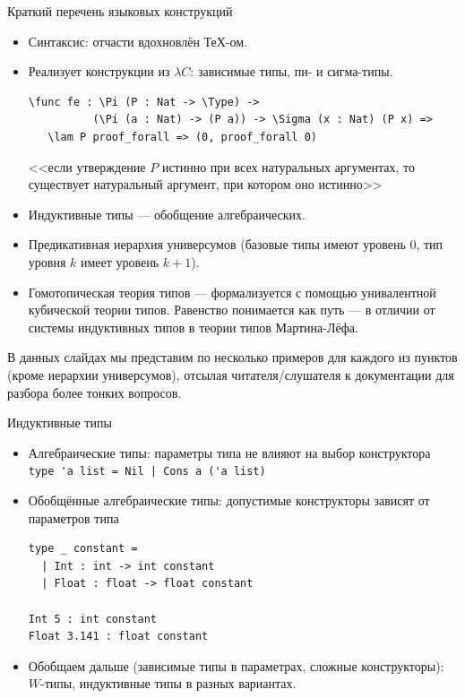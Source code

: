 \documentclass[aspectratio=169]{beamer}
\begin{document}
\begin{frame}[fragile]{Краткий перечень языковых конструкций}
\begin{itemize}
\item Синтаксис: отчасти вдохновлён ТеХ-ом.
\item Реализует конструкции из $\lambda C$: зависимые типы, пи- и сигма-типы.
\small\color[HTML]{025002}
\begin{verbatim}
\func fe : \Pi (P : Nat -> \Type) -> 
          (\Pi (a : Nat) -> (P a)) -> \Sigma (x : Nat) (P x) =>
   \lam P proof_forall => (0, proof_forall 0)
\end{verbatim}
\normalsize\color{black}
<<если утверждение $P$ истинно при всех натуральных аргументах, то существует натуральный
аргумент, при котором оно истинно>>
\item Индуктивные типы --- обобщение алгебраических.
\item Предикативная иерархия универсумов (базовые типы имеют уровень 0, тип уровня $k$ имеет уровень $k+1$).
\item Гомотопическая теория типов --- формализуется с помощью унивалентной кубической теории типов.
Равенство понимается как путь --- в отличии от системы индуктивных типов в теории типов Мартина-Лёфа.
\end{itemize}
В данных слайдах мы представим по несколько примеров для каждого из пунктов (кроме иерархии универсумов),
отсылая читателя/слушателя к документации для разбора более тонких вопросов.
\end{frame}

\begin{frame}[fragile]{Индуктивные типы}
\begin{itemize}
\item Алгебраические типы: параметры типа не влияют на выбор конструктора
\small\color[HTML]{025002}
\verb!type 'a list = Nil | Cons a ('a list)!
\normalsize
\color{black}

\item Обобщённые алгебраические типы: допустимые конструкторы зависят от параметров типа
\small\color[HTML]{025002}\begin{verbatim}
type _ constant =
  | Int : int -> int constant
  | Float : float -> float constant

Int 5 : int constant
Float 3.141 : float constant
\end{verbatim}\normalsize 
\color{black}

\item Обобщаем дальше (зависимые типы в параметрах, сложные конструкторы): $W$-типы, индуктивные типы в разных вариантах.
\end{itemize}
\end{frame}
\end{document}
